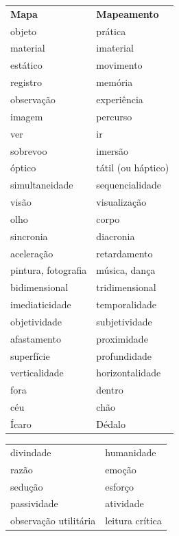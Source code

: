 \begin{table}[!htbp]
\begin{tabular}{ll}
\textbf{Mapa}         & \textbf{Mapeamento} \\
objeto                & prática             \\
material              & imaterial           \\
estático              & movimento           \\
registro              & memória             \\
observação            & experiência         \\
imagem                & percurso            \\
ver                   & ir                  \\
sobrevoo              & imersão             \\
óptico                & tátil (ou háptico)  \\
simultaneidade        & sequencialidade     \\
visão                 & visualização        \\
olho                  & corpo               \\
sincronia             & diacronia           \\
aceleração            & retardamento        \\
pintura, fotografia   & música, dança       \\
bidimensional         & tridimensional      \\
imediaticidade        & temporalidade       \\
objetividade          & subjetividade       \\
afastamento           & proximidade         \\
superfície            & profundidade        \\
verticalidade         & horizontalidade     \\
fora                  & dentro              \\
céu                   & chão                \\
Ícaro                 & Dédalo              \\
\end{tabular}
\end{table}

\begin{table}[!htbp]
\begin{tabular}{ll}
divindade             & humanidade          \\
razão                 & emoção              \\
sedução               & esforço             \\
passividade           & atividade           \\
observação utilitária & leitura crítica    
\end{tabular}
\end{table}

